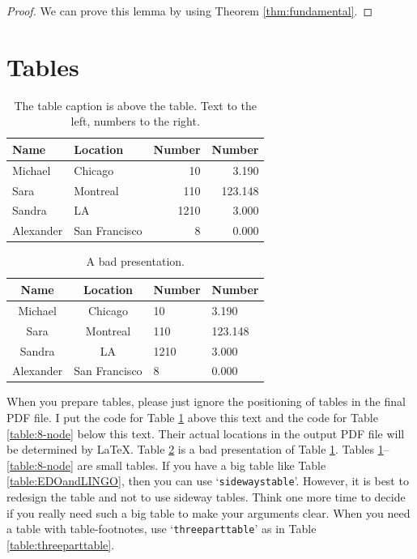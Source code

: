 \documentclass[letterpaper, 11pt]{article}
\newenvironment{example}
 {\VerbatimOut{\jobname.tmp}}
 {\endVerbatimOut
 \begin{center}
 \fbox{
	 \begin{minipage}[c]{0.48\textwidth}
	  
	 \end{minipage}
   }
 \fbox{
 	\begin{minipage}[c]{0.38\textwidth}
 	 \scriptsize
	 
  	\end{minipage}
  }
  \end{center}
 }
\begin{document}
\begin{example}
\begin{proof}
We can prove this lemma by using Theorem \ref{thm:fundamental}.
\end{proof}
\end{example}












\section{Tables}


\begin{table} \centering
\caption{The table caption is above the table. Text to the left, numbers to the right. }
\label{tbl:example}
\begin{tabular}{l l r r}
\toprule
Name		& Location		&  Number	& Number \\
\midrule
Michael		& Chicago			&      10   &   3.190  \\
Sara		& Montreal			&     110   & 123.148  \\
Sandra		& LA				&    1210   &   3.000  \\
Alexander	& San Francisco		&       8   &   0.000  \\
\bottomrule
\end{tabular}
\end{table}

\begin{table} \centering
\caption{A bad presentation.}
\label{tbl:bad_example}
\begin{tabular}{c c l l}
\toprule
Name		& Location		&  Number	& Number \\
\midrule
Michael		& Chicago			&      10   &   3.190  \\
Sara		& Montreal			&     110   & 123.148  \\
Sandra		& LA				&    1210   &   3.000  \\
Alexander	& San Francisco		&       8   &   0.000  \\
\bottomrule
\end{tabular}
\end{table}

When you prepare tables, please just ignore the positioning of tables in the final PDF file.
I put the code for Table \ref{tbl:example} above this text and the code for Table \ref{table:8-node} below this text.
Their actual locations in the output PDF file will be determined by LaTeX. Table \ref{tbl:bad_example} is a bad presentation of Table \ref{tbl:example}.
Tables \ref{tbl:example}--\ref{table:8-node} are small tables.
If you have a big table like Table \ref{table:EDOandLINGO}, then you can use `\texttt{sidewaystable}'.
However, it is best to redesign the table and not to use sideway tables.
Think one more time to decide if you really need such a big table to make your arguments clear.
When you need a table with table-footnotes, use `\texttt{threeparttable}' as in Table \ref{table:threeparttable}.
\end{document}
